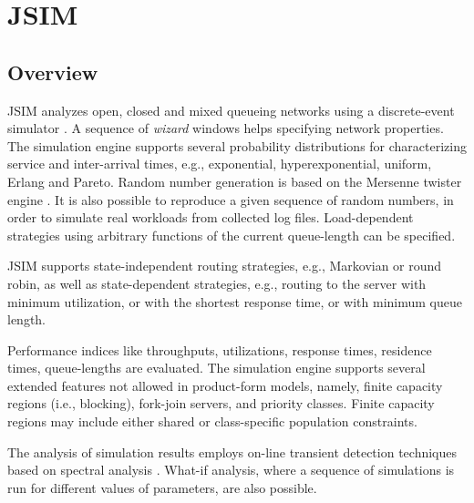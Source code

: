 %
%
%
%
%
\chapter{JSIM}
\label{cha:jsim}
\section{Overview}
JSIM analyzes open, closed and mixed queueing networks using a discrete-event simulator \cite{DESimulation}. A sequence of \emph{wizard} windows helps specifying network properties. The simulation engine supports several probability distributions for characterizing service and inter-arrival times, e.g., exponential, hyperexponential, uniform, Erlang and Pareto. Random number generation is based on the Mersenne twister engine \cite{Mersenne}. It is also possible to reproduce a given sequence of random numbers, in order to simulate real workloads from collected
log files. Load-dependent strategies using arbitrary functions of the current queue-length can be specified.

JSIM supports state-independent routing strategies, e.g., Markovian or round robin, as well as state-dependent strategies, e.g., routing to the server with minimum utilization, or
with the shortest response time, or with minimum queue length.

Performance indices like throughputs, utilizations, response times, residence times, queue-lengths are evaluated. The simulation engine supports several extended features
not allowed in product-form models, namely, finite capacity regions (i.e., blocking), fork-join servers, and priority classes. Finite capacity regions may include either shared
or class-specific population constraints. 

The analysis of simulation results employs on-line transient detection techniques based on spectral analysis \cite{Spectral}. What-if analysis, where a sequence of simulations is run for different
values of parameters, are also possible.


